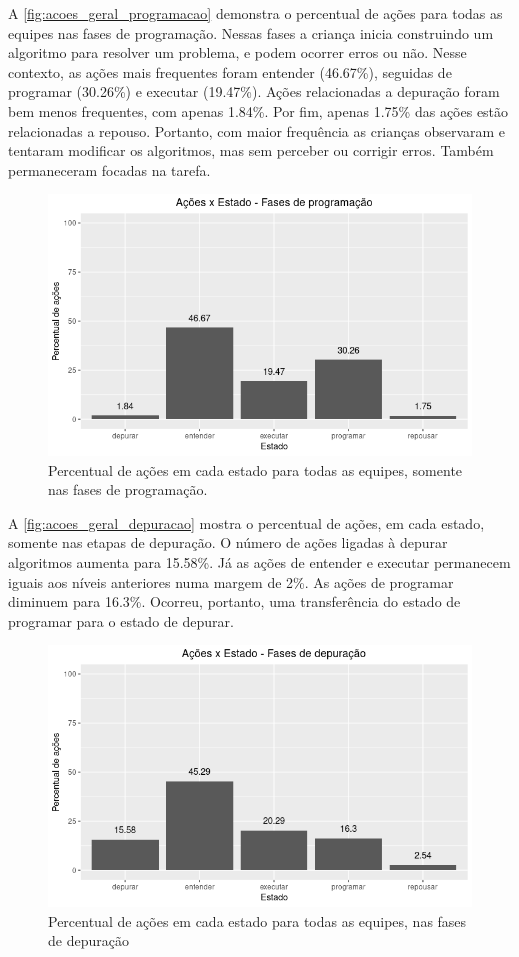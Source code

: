 A \autoref{fig:acoes_geral_programacao} demonstra o percentual de ações para todas as equipes nas fases de programação. Nessas fases a criança inicia construindo um algoritmo para resolver um problema, e podem ocorrer erros ou não. Nesse contexto, as ações mais frequentes foram entender (46.67\%), seguidas de programar (30.26\%) e executar (19.47\%). Ações relacionadas a depuração foram bem menos frequentes, com apenas 1.84\%. Por fim, apenas 1.75\% das ações estão relacionadas a repouso. Portanto, com maior frequência as crianças observaram e tentaram modificar os algoritmos, mas sem perceber ou corrigir erros. Também permaneceram focadas na tarefa. 
\begin{figure}[!htpb]
    \centering
    \includegraphics[width=.6\linewidth,fbox]{figs/graficos/acoes_geral_programacao.png}
    
    \caption{Percentual de ações em cada estado para todas as equipes, somente nas fases de programação.}
    \sourceauthor
    \label{fig:acoes_geral_programacao}
\end{figure}

A \autoref{fig:acoes_geral_depuracao} mostra o percentual de ações, em cada estado, somente nas etapas de depuração. O número de ações ligadas à depurar algoritmos aumenta para 15.58\%. Já as ações de entender e executar permanecem iguais aos níveis anteriores numa margem de 2\%. As ações de programar diminuem para 16.3\%. Ocorreu, portanto, uma transferência do estado de programar para o estado de depurar. 

\begin{figure}[!htpb]
    \centering
    \includegraphics[width=.6\linewidth,fbox]{figs/graficos/acoes_geral_depuracao.png}

    \caption{Percentual de ações em cada estado para todas as equipes, nas fases de depuração}
    \sourceauthor
    \label{fig:\autoref{fig:acoes_geral_programacao}}
\end{figure}

